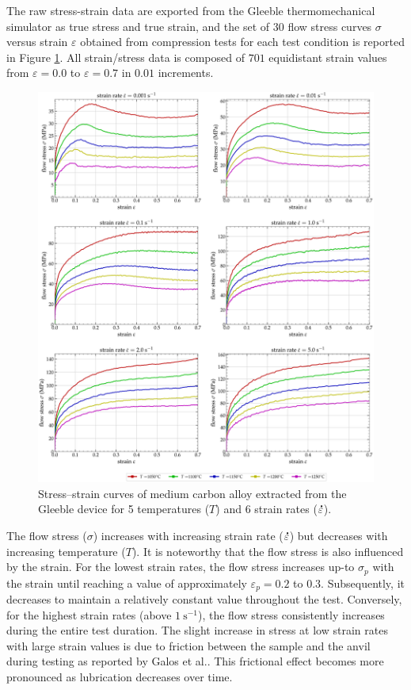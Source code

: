 \documentclass[metals,article,submit,pdftex,moreauthors]{Definitions/mdpi}
\makeatletter
\DeclareRobustCommand{\mdot}[1]{\accentset{\mbox{\bfseries .}}{#1}}
\DeclareRobustCommand{\eal}{et al.\@\xspace}
\DeclareRobustCommand{\ps}{\text{s}^{-1}}
\makeatother
\begin{document}
The raw stress-strain data are exported from the Gleeble thermomechanical simulator as true stress and true strain, and the set of $30$ flow stress curves $\sigma$ versus strain $\varepsilon$ obtained from compression tests for each test condition is reported in Figure \ref{fig:RawData}.
All strain/stress data is composed of $701$ equidistant strain values from $\varepsilon=0.0$ to $\varepsilon=0.7$ in $0.01$ increments.
\begin{figure}[H]
\centering
\includegraphics[width=0.9\columnwidth]{Figures/rawData}
\caption{Stress--strain curves of medium carbon alloy extracted from the Gleeble device for 5 temperatures ($T$) and 6 strain rates ($\mdot\varepsilon$).}
\label{fig:RawData}
\end{figure}

The flow stress ($\sigma$) increases with increasing strain rate ($\mdot\varepsilon$) but decreases with increasing temperature ($T$).
It is noteworthy that the flow stress is also influenced by the strain.
For the lowest strain rates, the flow stress increases up-to $\sigma_p$ with the strain until reaching a value of approximately $\varepsilon_p=0.2$ to $0.3$.
Subsequently, it decreases to maintain a relatively constant value throughout the test.
Conversely, for the highest strain rates (above $1~\ps$), the flow stress consistently increases during the entire test duration.
The slight increase in stress at low strain rates with large strain values is due to friction between the sample and the anvil during testing as reported by Galos \eal \cite{Galos-2022}.
This frictional effect becomes more pronounced as lubrication decreases over time.
\end{document}
